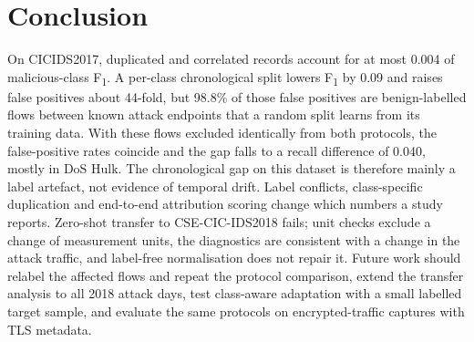 \documentclass[conference]{IEEEtran}
\newcommand{\Fone}{F\textsubscript{1}}
\begin{document}
\section{Conclusion}

On CICIDS2017, duplicated and correlated records account for at most 0.004 of malicious-class \Fone{}. A per-class chronological split lowers \Fone{} by 0.09 and raises false positives about 44-fold, but 98.8\% of those false positives are benign-labelled flows between known attack endpoints that a random split learns from its training data. With these flows excluded identically from both protocols, the false-positive rates coincide and the gap falls to a recall difference of 0.040, mostly in DoS Hulk. The chronological gap on this dataset is therefore mainly a label artefact, not evidence of temporal drift. Label conflicts, class-specific duplication and end-to-end attribution scoring change which numbers a study reports. Zero-shot transfer to CSE-CIC-IDS2018 fails; unit checks exclude a change of measurement units, the diagnostics are consistent with a change in the attack traffic, and label-free normalisation does not repair it. Future work should relabel the affected flows and repeat the protocol comparison, extend the transfer analysis to all 2018 attack days, test class-aware adaptation with a small labelled target sample, and evaluate the same protocols on encrypted-traffic captures with TLS metadata.
\end{document}
